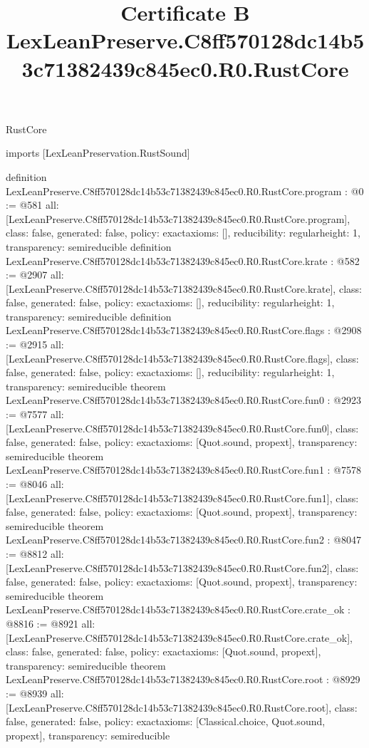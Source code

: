 \begin{lexlean}{RustCore}
\title{Certificate B LexLeanPreserve.C8ff570128dc14b53c71382439c845ec0.R0.RustCore}
\begin{coremodule}
imports [LexLeanPreservation.RustSound]

definition LexLeanPreserve.C8ff570128dc14b53c71382439c845ec0.R0.RustCore.program : @0 := @581 {
  all: [LexLeanPreserve.C8ff570128dc14b53c71382439c845ec0.R0.RustCore.program],
  class: false,
  generated: false,
  policy: exact{axioms: []},
  reducibility: regular{height: 1},
  transparency: semireducible
}
definition LexLeanPreserve.C8ff570128dc14b53c71382439c845ec0.R0.RustCore.krate : @582 := @2907 {
  all: [LexLeanPreserve.C8ff570128dc14b53c71382439c845ec0.R0.RustCore.krate],
  class: false,
  generated: false,
  policy: exact{axioms: []},
  reducibility: regular{height: 1},
  transparency: semireducible
}
definition LexLeanPreserve.C8ff570128dc14b53c71382439c845ec0.R0.RustCore.flags : @2908 := @2915 {
  all: [LexLeanPreserve.C8ff570128dc14b53c71382439c845ec0.R0.RustCore.flags],
  class: false,
  generated: false,
  policy: exact{axioms: []},
  reducibility: regular{height: 1},
  transparency: semireducible
}
theorem LexLeanPreserve.C8ff570128dc14b53c71382439c845ec0.R0.RustCore.fun0 : @2923 := @7577 {
  all: [LexLeanPreserve.C8ff570128dc14b53c71382439c845ec0.R0.RustCore.fun0],
  class: false,
  generated: false,
  policy: exact{axioms: [Quot.sound, propext]},
  transparency: semireducible
}
theorem LexLeanPreserve.C8ff570128dc14b53c71382439c845ec0.R0.RustCore.fun1 : @7578 := @8046 {
  all: [LexLeanPreserve.C8ff570128dc14b53c71382439c845ec0.R0.RustCore.fun1],
  class: false,
  generated: false,
  policy: exact{axioms: [Quot.sound, propext]},
  transparency: semireducible
}
theorem LexLeanPreserve.C8ff570128dc14b53c71382439c845ec0.R0.RustCore.fun2 : @8047 := @8812 {
  all: [LexLeanPreserve.C8ff570128dc14b53c71382439c845ec0.R0.RustCore.fun2],
  class: false,
  generated: false,
  policy: exact{axioms: [Quot.sound, propext]},
  transparency: semireducible
}
theorem LexLeanPreserve.C8ff570128dc14b53c71382439c845ec0.R0.RustCore.crate_ok : @8816 := @8921 {
  all: [LexLeanPreserve.C8ff570128dc14b53c71382439c845ec0.R0.RustCore.crate_ok],
  class: false,
  generated: false,
  policy: exact{axioms: [Quot.sound, propext]},
  transparency: semireducible
}
theorem LexLeanPreserve.C8ff570128dc14b53c71382439c845ec0.R0.RustCore.root : @8929 := @8939 {
  all: [LexLeanPreserve.C8ff570128dc14b53c71382439c845ec0.R0.RustCore.root],
  class: false,
  generated: false,
  policy: exact{axioms: [Classical.choice, Quot.sound, propext]},
  transparency: semireducible
}


\end{coremodule}
\end{lexlean}
